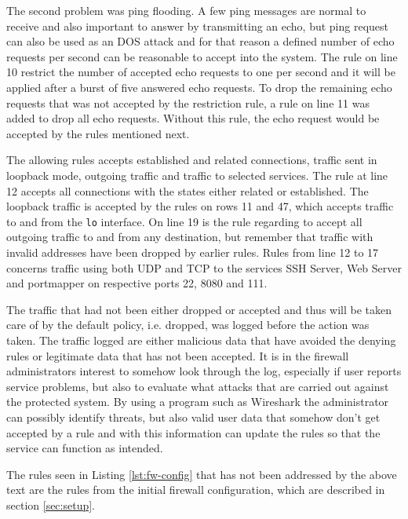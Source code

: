 The second problem was ping flooding. A few ping messages are normal to receive and also important to answer by transmitting an echo, but ping request can also be used as an DOS attack and for that reason a defined number of echo requests per second can be reasonable to accept into the system. The rule on line 10 restrict the number of accepted echo requests to one per second and it will be applied after a burst of five answered echo requests. To drop the remaining echo requests that was not accepted by the restriction rule, a rule on line 11 was added to drop all echo requests. Without this rule, the echo request would be accepted by the rules mentioned next.

The allowing rules accepts established and related connections, traffic sent in loopback mode, outgoing traffic and traffic to selected services. The rule at line 12  accepts all connections with the states either related or established. The loopback traffic is accepted by the rules on rows 11 and 47, which accepts traffic to and from the \texttt{lo} interface. On line 19 is the rule regarding to accept all outgoing traffic to and from any destination, but remember that traffic with invalid addresses have been dropped by earlier rules. Rules from line 12 to 17 concerns traffic using both UDP and TCP to the services SSH Server, Web Server and portmapper on respective ports 22, 8080 and 111.

The traffic that had not been either dropped or accepted and thus will be taken care of by the default policy, i.e. dropped, was logged before the action was taken. The traffic logged are either malicious data that have avoided the denying rules or legitimate data that has not been accepted. It is in the firewall administrators interest to somehow look through the log, especially if user reports service problems, but also to evaluate what attacks that are carried out against the protected system. By using a program such as Wireshark the administrator can possibly identify threats, but also valid user data that somehow don't get accepted by a rule and with this information can update the rules so that the service can function as intended. 

The rules seen in Listing \ref{lst:fw-config} that has not been addressed by the above text are the rules from the initial firewall configuration, which are described in section \ref{sec:setup}.

